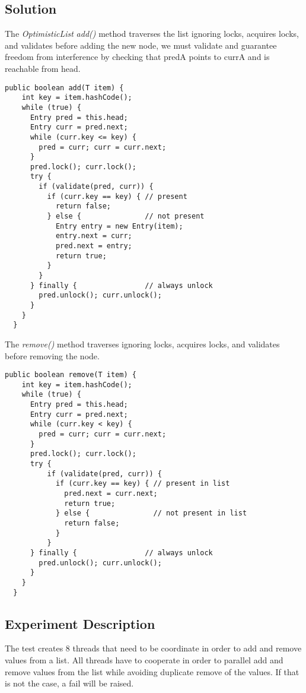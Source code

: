 \subsection{Solution}
\par
The \textit{OptimisticList} \textit{add()} method traverses the list ignoring locks, acquires locks, and validates before adding the new node, we must validate and guarantee freedom from interference by checking that predA points to currA and is reachable from head.
\par
\begin{lstlisting}[frame=single,breaklines=true]
  public boolean add(T item) {
    int key = item.hashCode();
    while (true) {
      Entry pred = this.head;
      Entry curr = pred.next;
      while (curr.key <= key) {
        pred = curr; curr = curr.next;
      }
      pred.lock(); curr.lock();
      try {
        if (validate(pred, curr)) {
          if (curr.key == key) { // present
            return false;
          } else {               // not present
            Entry entry = new Entry(item);
            entry.next = curr;
            pred.next = entry;
            return true;
          }
        }
      } finally {                // always unlock
        pred.unlock(); curr.unlock();
      }
    }
  }
\end{lstlisting}
The \textit{remove()} method traverses ignoring locks, acquires locks, and validates before removing the node.
\par
\begin{lstlisting}[frame=single,breaklines=true]
  public boolean remove(T item) {
    int key = item.hashCode();
    while (true) {
      Entry pred = this.head;
      Entry curr = pred.next;
      while (curr.key < key) {
        pred = curr; curr = curr.next;
      }
      pred.lock(); curr.lock();
      try {
          if (validate(pred, curr)) {
            if (curr.key == key) { // present in list
              pred.next = curr.next;
              return true;
            } else {               // not present in list
              return false;
            }
          }
      } finally {                // always unlock
        pred.unlock(); curr.unlock();
      }
    }
  }
\end{lstlisting}



\subsection{Experiment Description} 
\par
The test creates $8$ threads that need to be coordinate in order to add and remove values from a list. All threads have to cooperate in order to parallel add and remove values from the list while avoiding duplicate remove of the values.
If that is not the case, a fail will be raised.
\par

